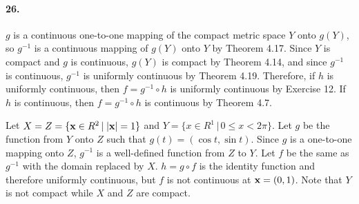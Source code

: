 \documentclass[a4paper]{article}
\begin{document}
\paragraph{26.}
$g$ is a continuous one-to-one mapping of the compact metric space $Y$ onto $g(Y)$, so $g^{-1}$ is a continuous mapping of $g(Y)$ onto $Y$ by Theorem 4.17. Since $Y$ is compact and $g$ is continuous, $g(Y)$ is compact by Theorem 4.14, and since $g^{-1}$ is continuous, $g^{-1}$ is uniformly continuous by Theorem 4.19. Therefore, if $h$ is uniformly continuous, then $f=g^{-1}\circ h$ is uniformly continuous by Exercise 12. If $h$ is continuous, then $f=g^{-1}\circ h$ is continuous by Theorem 4.7.

Let $X=Z=\{\mathbf{x}\in R^2\,|\; |\mathbf{x}|=1\}$ and $Y=\{x\in R^1\,|\,0\leq x<2\pi\}$. Let $g$ be the function from $Y$ onto $Z$ such that $g(t)=(\cos t,\sin t)$. Since $g$ is a one-to-one mapping onto $Z$,\; $g^{-1}$ is a well-defined function from $Z$ to $Y$. Let $f$ be the same as $g^{-1}$ with the domain replaced by $X$.\; $h=g\circ f$ is the identity function and therefore uniformly continuous, but $f$ is not continuous at $\mathbf{x}=(0,1)$. Note that $Y$ is not compact while $X$ and $Z$ are compact.
\end{document}
